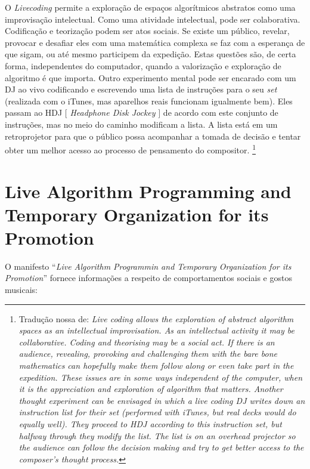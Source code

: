 \begin{citacao}
O \emph{Livecoding} permite a exploração de espaços algorítmicos abstratos como uma improvisação intelectual. Como uma atividade intelectual, pode ser colaborativa. Codificação e teorização podem ser atos sociais. Se existe um público, revelar, provocar e desafiar eles com uma matemática complexa se faz com a esperança de que sigam, ou até mesmo participem da expedição. Estas questões são, de certa forma, independentes do computador, quando a valorização e exploração de algoritmo é que importa. Outro experimento mental pode ser encarado com um DJ ao vivo codificando e escrevendo uma lista de instruções para o seu \emph{set} (realizada com o iTunes, mas aparelhos reais funcionam igualmente bem). Eles passam ao HDJ $[$ \emph{Headphone Disk Jockey} $]$ de acordo com este conjunto de instruções, mas no meio do caminho modificam a lista. A lista está em um retroprojetor para que o público possa acompanhar a tomada de decisão e tentar obter um melhor acesso ao processo de pensamento do compositor. \cite[p.~245]{ward_live_2004} \footnote{Tradução nossa de: \emph{Live coding allows the exploration of abstract algorithm spaces as an intellectual improvisation. As an intellectual activity it may be collaborative. Coding and theorising may be a social act. If there is an audience, revealing, provoking and challenging them with the bare bone mathematics can hopefully make them follow along or even take part in the expedition. These issues are in some ways independent of the computer, when it is the appreciation and exploration of algorithm that matters.   Another thought experiment can be envisaged in which a live coding DJ writes down an instruction list for their set (performed with iTunes, but real decks would do equally well). They proceed to HDJ according to this instruction set, but halfway through they modify the list. The list is on an overhead projector so the audience can follow the decision making and try to get better access to the composer’s thought process.}}
\end{citacao}

\section{Live Algorithm Programming and Temporary Organization for its Promotion}

O manifesto ``\emph{Live Algorithm Programmin and Temporary Organization for its Promotion}'' \cite{ward_live_2004} fornece informações a respeito de comportamentos sociais e gostos musicais:

